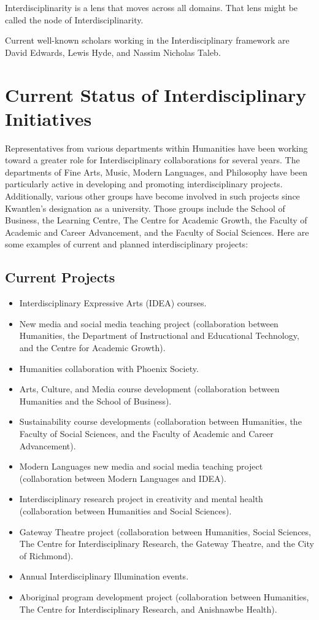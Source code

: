 \documentclass[12pt,DIV11,letterpaper,oneside,abstractoff,headsepline]{scrreprt}
\begin{document}
Interdisciplinarity is a lens that moves across all domains. That lens might be called the node of Interdisciplinarity.

Current well-known scholars working in the Interdisciplinary framework are David Edwards, Lewis Hyde, and Nassim Nicholas Taleb.

\newpage
\section{Current Status of Interdisciplinary Initiatives}
\label{sec-2}

Representatives from various departments within Humanities have been working toward a greater role for Interdisciplinary collaborations for several years. The departments of Fine Arts, Music, Modern Languages, and Philosophy have been particularly active in developing and promoting interdisciplinary projects. Additionally, various other groups have become involved in such projects since Kwantlen's designation as a university. Those groups include the School of Business, the Learning Centre, The Centre for Academic Growth, the Faculty of Academic and Career Advancement, and the Faculty of Social Sciences. Here are some examples of current and planned interdisciplinary projects:
\subsection{Current Projects}
\label{sec-2.1}

\begin{itemize}
\item Interdisciplinary Expressive Arts (IDEA) courses.
\item New media and social media teaching project (collaboration between
    Humanities, the Department of Instructional and Educational
    Technology, and the Centre for Academic Growth).
\item Humanities collaboration with Phoenix Society.
\item Arts, Culture, and Media course development (collaboration
    between Humanities and the School of Business).
\item Sustainability course developments (collaboration between
    Humanities, the Faculty of Social Sciences, and the Faculty of
    Academic and Career Advancement).
\item Modern Languages new media and social media teaching project
    (collaboration between Modern Languages and IDEA).
\item Interdisciplinary research project in creativity and mental
    health (collaboration between Humanities and Social Sciences).
\item Gateway Theatre project (collaboration between Humanities, Social Sciences, The Centre for Interdisciplinary Research, the Gateway Theatre, and the City of Richmond).
\item Annual Interdisciplinary Illumination events.
  \item Aboriginal program development project (collaboration between Humanities, The Centre for Interdisciplinary Research, and Anishnawbe Health).
\end{itemize}
\end{document}
